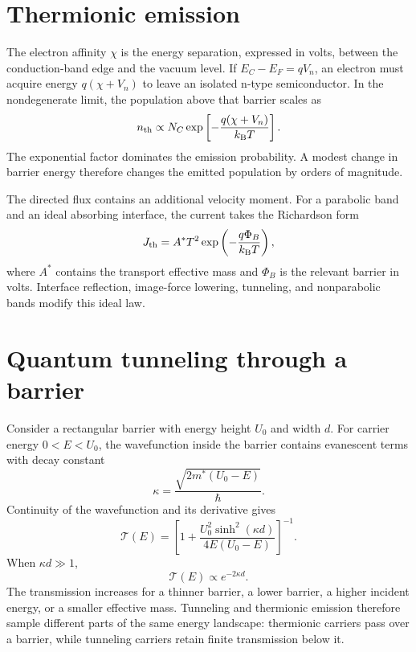 \section{Thermionic emission}

The electron affinity $\chi$ is the energy separation, expressed in volts,
between the conduction-band edge and the vacuum level.  If
$E_C-E_F=qV_n$, an electron must acquire energy $q(\chi+V_n)$ to leave an
isolated n-type semiconductor.  In the nondegenerate limit, the population
above that barrier scales as
\begin{equation}
  n_{\mathrm{th}}
  \propto N_C
  \exp\left[-\frac{q(\chi+V_n)}{k_{\mathrm B} T}\right].
  \label{eq:thermionic-tail-density}
\end{equation}
The exponential factor dominates the emission probability.  A modest change in
barrier energy therefore changes the emitted population by orders of
magnitude.

The directed flux contains an additional velocity moment.  For a parabolic
band and an ideal absorbing interface, the current takes the Richardson form
\begin{equation}
  J_{\mathrm{th}}=A^*T^2
  \exp\left(-\frac{q\Phi_B}{k_{\mathrm B} T}\right),
  \label{eq:richardson-emission}
\end{equation}
where $A^*$ contains the transport effective mass and $\Phi_B$ is the relevant
barrier in volts.  Interface reflection, image-force lowering, tunneling, and
nonparabolic bands modify this ideal law.

\section{Quantum tunneling through a barrier}

Consider a rectangular barrier with energy height $U_0$ and width $d$.  For
carrier energy $0<E<U_0$, the wavefunction inside the barrier contains
evanescent terms with decay constant
\begin{equation}
  \kappa=\frac{\sqrt{2m^*(U_0-E)}}{\hbar}.
  \label{eq:rectangular-kappa}
\end{equation}
Continuity of the wavefunction and its derivative gives
\begin{equation}
  \boxed{
  \mathcal T(E)=
  \left[
    1+\frac{U_0^2\sinh^2(\kappa d)}{4E(U_0-E)}
  \right]^{-1}.
  }
  \label{eq:rectangular-barrier-transmission}
\end{equation}
When $\kappa d\gg1$,
\begin{equation}
  \mathcal T(E)\propto e^{-2\kappa d}.
  \label{eq:tunneling-wkb-scaling}
\end{equation}
The transmission increases for a thinner barrier, a lower barrier, a higher
incident energy, or a smaller effective mass.  Tunneling and thermionic
emission therefore sample different parts of the same energy landscape:
thermionic carriers pass over a barrier, while tunneling carriers retain finite
transmission below it.

